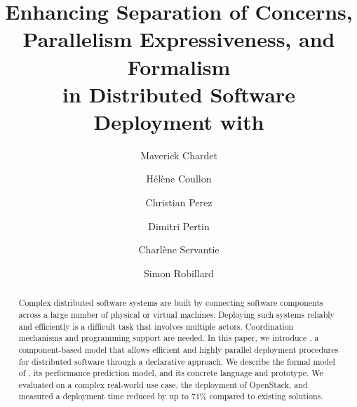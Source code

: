 \documentclass[5p]{elsarticle}
\begin{document}
\begin{frontmatter}

  \title{Enhancing Separation of Concerns, Parallelism Expressiveness, and
  Formalism\\ in Distributed Software Deployment with \mad}

  \author[label1]{Maverick Chardet}
  \author[label1]{Hélène Coullon}
  \author[label2]{Christian Perez}
  \author[label1]{Dimitri Pertin}
  \author[label1]{Charlène Servantie}
  \author[label1]{Simon Robillard}

\address[label1]{IMT Atlantique, Inria, LS2N, UBL, F-44307 Nantes, France}
\address[label2]{Univ Lyon, Inria, EnsL, UCBL, CNRS, LIP, Lyon, France}


\begin{abstract}
Complex distributed software systems are built by connecting software
components across a large number of physical or virtual machines.
Deploying such systems reliably and efficiently is a difficult task
that involves multiple actors. Coordination mechanisms and programming
support are needed.
%
In this paper, we introduce \mad, a component-based model that allows efficient and
highly parallel deployment procedures for distributed software
through a declarative approach. We describe the formal model of \mad,
its performance prediction model, and its concrete language and
prototype. We evaluated \mad on a complex real-world use case, the
deployment of OpenStack, and measured a deployment time reduced by up
to 71\% compared to existing solutions.


\end{abstract}
\end{frontmatter}
\end{document}
